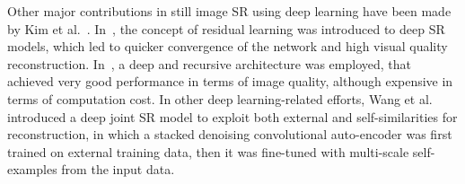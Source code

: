 \documentclass[10pt,twocolumn,letterpaper]{article}
\begin{document}
Other major contributions in still image SR using deep learning have 
been made by Kim et al.~\cite{kim2016a,kim2016b}. In~\cite{kim2016a}, the concept of 
residual learning was introduced to deep SR models, which 
led to quicker convergence of the network and high visual quality reconstruction. 
In~\cite{kim2016b}, a deep and recursive architecture was employed, that achieved
very good performance in terms of image quality, although expensive in terms of computation 
cost. In other deep learning-related efforts, Wang et al.~\cite{wang2015} introduced a deep joint SR model to 
exploit both external and self-similarities for reconstruction, in which a stacked denoising 
convolutional auto-encoder was first trained on external training data, then it was
fine-tuned with multi-scale self-examples from the input data.
\end{document}
